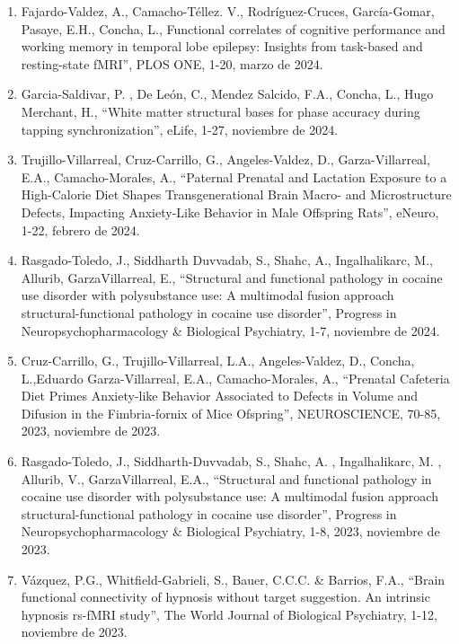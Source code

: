 \begin{enumerate}
\item Fajardo-Valdez, A., Camacho-Téllez. V., Rodríguez-Cruces, García-Gomar, Pasaye, E.H., Concha, L., Functional correlates 
of 
cognitive performance and working memory in temporal lobe epilepsy: Insights from task-based and resting-state fMRI”, PLOS 
ONE, 1-20,    marzo de 2024.

\item Garcia-Saldivar, P. , De León, C., Mendez Salcido, F.A., Concha, L., Hugo Merchant, H., “White matter structural bases 
for 
phase accuracy during tapping synchronization”, eLife, 1-27,    noviembre de 2024.

\item Trujillo-Villarreal, Cruz-Carrillo, G., Angeles-Valdez, D., Garza-Villarreal, E.A., Camacho-Morales, A., “Paternal 
Prenatal and Lactation Exposure to a High-Calorie Diet Shapes Transgenerational Brain Macro- and Microstructure Defects, 
Impacting Anxiety-Like Behavior in Male Offspring Rats”, eNeuro, 1-22,    febrero de 2024.

\item Rasgado-Toledo, J., Siddharth Duvvadab, S., Shahc, A., Ingalhalikarc, M., Allurib, GarzaVillarreal, E., “Structural and 
functional pathology in cocaine use disorder with polysubstance use: A multimodal fusion approach structural-functional 
pathology in cocaine use disorder”, Progress in Neuropsychopharmacology \& Biological Psychiatry, 1-7, noviembre de 2024.

\item Cruz-Carrillo, G., Trujillo-Villarreal, L.A., Angeles-Valdez, D., Concha, L.,Eduardo Garza-Villarreal, E.A., 
Camacho-Morales, A., “Prenatal Cafeteria Diet Primes Anxiety-like Behavior Associated to Defects in Volume and Difusion in 
the Fimbria-fornix of Mice Ofspring”, NEUROSCIENCE, 70-85, 2023,    noviembre de 2023.

\item Rasgado-Toledo, J., Siddharth-Duvvadab, S., Shahc, A. , Ingalhalikarc, M. , Allurib, V., GarzaVillarreal, E.A., 
“Structural and functional pathology in cocaine use disorder with polysubstance use: A multimodal fusion approach 
structural-functional pathology in cocaine use disorder”, Progress in Neuropsychopharmacology \& Biological Psychiatry, 1-8, 
2023,    noviembre de 2023.

\item Vázquez, P.G., Whitfield-Gabrieli, S., Bauer, C.C.C. \& Barrios, F.A., “Brain functional connectivity of hypnosis 
without 
target suggestion. An intrinsic hypnosis rs-fMRI study”, The World Journal of Biological Psychiatry, 1-12, noviembre de 2023.


\end{enumerate}
